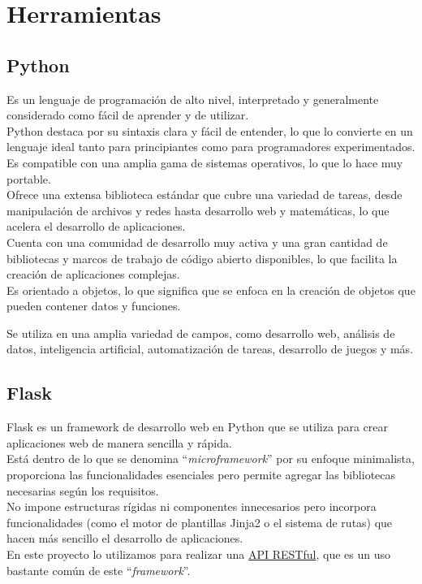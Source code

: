 \section{Herramientas}

\subsection{Python~\cite{lutz2001programming}}
Es un lenguaje de programación de alto nivel, interpretado y generalmente 
considerado como fácil de aprender y de utilizar. \\
Python destaca por su sintaxis clara y fácil de entender, 
lo que lo convierte en un lenguaje ideal tanto para principiantes 
como para programadores experimentados.\\
Es compatible con una amplia gama de sistemas operativos, 
lo que lo hace muy portable.\\

Ofrece una extensa biblioteca estándar que cubre una variedad de tareas, 
desde manipulación de archivos y redes hasta desarrollo web y 
matemáticas, lo que acelera el desarrollo de aplicaciones.\\
Cuenta con una comunidad de desarrollo muy activa y 
una gran cantidad de bibliotecas y marcos de trabajo de código abierto disponibles, 
lo que facilita la creación de aplicaciones complejas.\\
Es orientado a objetos, lo que significa que se enfoca en la creación de objetos 
que pueden contener datos y funciones.

Se utiliza en una amplia variedad de campos, como desarrollo web, 
análisis de datos, inteligencia artificial, automatización de tareas, desarrollo de juegos y más.

\subsection{Flask~\cite{dwyer2017flask}}
Flask es un framework de desarrollo web en Python que se utiliza 
para crear aplicaciones web de manera sencilla y rápida. \\
Está dentro de lo que se denomina ``\emph{microframework}'' por su enfoque minimalista, proporciona 
las funcionalidades esenciales pero permite agregar las bibliotecas necesarias según los requisitos.\\
No impone estructuras rígidas ni componentes innecesarios pero incorpora funcionalidades 
(como el motor de plantillas Jinja2 o el sistema de rutas) que hacen 
más sencillo el desarrollo de aplicaciones. \\
En este proyecto lo utilizamos para realizar una \href{https://aws.amazon.com/es/what-is/restful-api}{API RESTful}, que es un uso bastante común de este ``\emph{framework}''.


